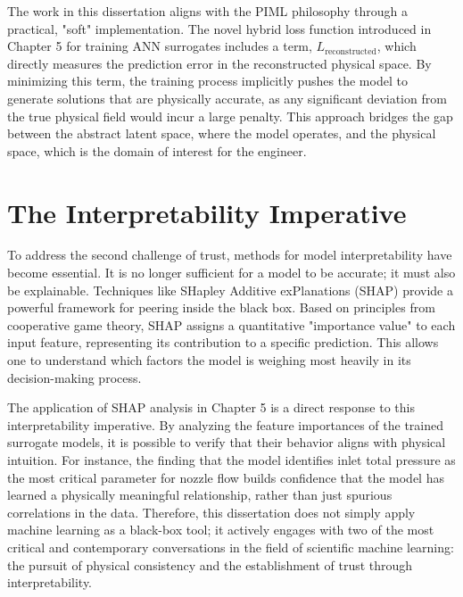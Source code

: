 The work in this dissertation aligns with the PIML philosophy through a practical, "soft" implementation. The novel hybrid loss function introduced in Chapter 5 for training ANN surrogates includes a term, $L_{\text{reconstructed}}$, which directly measures the prediction error in the reconstructed physical space. By minimizing this term, the training process implicitly pushes the model to generate solutions that are physically accurate, as any significant deviation from the true physical field would incur a large penalty. This approach bridges the gap between the abstract latent space, where the model operates, and the physical space, which is the domain of interest for the engineer.


\section{The Interpretability Imperative}

To address the second challenge of trust, methods for model interpretability have become essential. It is no longer sufficient for a model to be accurate; it must also be explainable. Techniques like SHapley Additive exPlanations (SHAP) provide a powerful framework for peering inside the black box. Based on principles from cooperative game theory, SHAP assigns a quantitative "importance value" to each input feature, representing its contribution to a specific prediction. This allows one to understand which factors the model is weighing most heavily in its decision-making process. 

The application of SHAP analysis in Chapter 5 is a direct response to this interpretability imperative. By analyzing the feature importances of the trained surrogate models, it is possible to verify that their behavior aligns with physical intuition. For instance, the finding that the model identifies inlet total pressure as the most critical parameter for nozzle flow builds confidence that the model has learned a physically meaningful relationship, rather than just spurious correlations in the data. Therefore, this dissertation does not simply apply machine learning as a black-box tool; it actively engages with two of the most critical and contemporary conversations in the field of scientific machine learning: the pursuit of physical consistency and the establishment of trust through interpretability. 